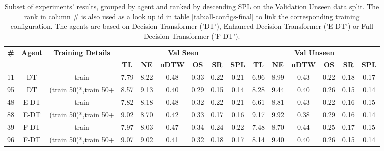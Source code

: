 \begin{table}
\centering
\caption{\label{tab:split_training_50}Subset of experiments' results, grouped by agent and ranked by descending SPL on the Validation Unseen data split. The rank in column \# is also used as a look up id in table \ref{tab:all-configs-final} to link the corresponding training configuration.     \newline The agents are based on Decision Transformer ('DT'), Enhanced Decision Transformer ('E-DT') or Full Decision Transformer ('F-DT').}
\begin{tabular}{@{\hskip3pt}c@{\hskip3pt}c@{\hskip3pt}c@{\hskip3pt}c@{\hskip3pt}c@{\hskip3pt}c@{\hskip3pt}c@{\hskip3pt}c@{\hskip3pt}c@{\hskip3pt}c@{\hskip3pt}c@{\hskip3pt}c@{\hskip3pt}c@{\hskip3pt}c@{\hskip3pt}c}
\toprule
\textbf{\#} & \textbf{Agent} & \textbf{Training Details} & \multicolumn{6}{c}{\textbf{Val Seen}} & \multicolumn{6}{c}{\textbf{Val Unseen}} \\
 \textbf{~} &     \textbf{~} &                \textbf{~} &       \textbf{TL} & \textbf{NE} & \textbf{nDTW} & \textbf{OS} & \textbf{SR} & \textbf{SPL} &         \textbf{TL} & \textbf{NE} & \textbf{nDTW} & \textbf{OS} & \textbf{SR} & \textbf{SPL} \\
\midrule
         11 &             DT &                     train &              7.79 &        8.22 &          0.48 &        0.33 &        0.22 &         0.21 &                6.96 &        8.99 &          0.43 &        0.22 &        0.18 &         0.17 \\
         95 &             DT &     (train 50)*,train 50+ &              8.57 &        9.13 &          0.40 &        0.29 &        0.15 &         0.14 &                8.28 &        9.44 &          0.40 &        0.26 &        0.15 &         0.14 \\
         48 &           E-DT &                     train &              7.82 &        8.18 &          0.48 &        0.32 &        0.22 &         0.21 &                6.61 &        8.81 &          0.43 &        0.22 &        0.16 &         0.15 \\
         88 &           E-DT &     (train 50)*,train 50+ &              9.02 &        8.70 &          0.42 &        0.33 &        0.17 &         0.16 &                9.17 &        9.92 &          0.38 &        0.29 &        0.16 &         0.14 \\
         39 &           F-DT &                     train &              7.97 &        8.03 &          0.47 &        0.34 &        0.24 &         0.22 &                7.48 &        8.70 &          0.44 &        0.25 &        0.17 &         0.15 \\
         96 &           F-DT &     (train 50)*,train 50+ &              9.07 &        9.02 &          0.41 &        0.32 &        0.18 &         0.17 &                8.14 &        9.40 &          0.40 &        0.26 &        0.15 &         0.14 \\
\bottomrule
\end{tabular}
\end{table}
